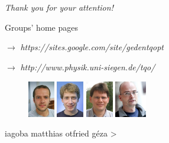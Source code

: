 \documentclass{beamer}
\begin{document}
\section*{}
	\begin{frame}
		\emph{\LARGE Thank you for your attention!}

		\vspace{15px}
		Groups' home pages

		\hspace{15px} $\rightarrow$ \emph{\color{blue} https://sites.google.com/site/gedentqopt}

		\hspace{15px} $\rightarrow$ \emph{\color{blue} http://www.physik.uni-siegen.de/tqo/}
		\vspace{10px}

		\begin{figure}
			\includegraphics[height=60px]{img/authors/iagoba.jpg}
			\hspace{10px}
			\includegraphics[height=60px]{img/authors/matthias.jpg}
			\hspace{10px}
			\includegraphics[height=60px]{img/authors/otfried.jpg}
			\hspace{10px}
			\includegraphics[height=60px]{img/authors/geza.jpg}
		\end{figure}
		\vspace{-25px}

		\begin{center}
			iagoba \hspace{16px}
			matthias \hspace{16px}
			otfried \hspace{30px}
			g\'eza {\color{white}>}
		\end{center}
	\end{frame}
\end{document}
